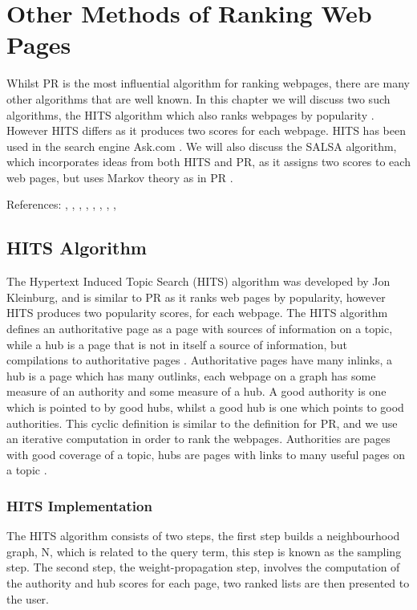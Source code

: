 \documentclass[11pt]{report}
\begin{document}
\chapter{Other Methods of Ranking Web Pages}

Whilst PR is the most influential algorithm for ranking webpages, there are many other algorithms that are well known. In this chapter we will discuss two such algorithms, the HITS algorithm which also ranks webpages by popularity \cite{kleinberg1999authoritative}. However HITS differs as it produces two scores for each webpage. HITS has been used in the search engine Ask.com \cite{bonato}. We will also discuss the SALSA algorithm, which incorporates ideas from both HITS and PR, as it assigns two scores to each web pages, but uses Markov theory as in PR \cite{lempel2000stochastic}. 


References: \cite{baldi2003modeling}, \cite{bharat1998improved}, \cite{bonato}, \cite{ding2003pagerank}, \cite{farahat2006authority}, \cite{langville}, \cite{manning}, \cite{ng2001link}, \cite{ng2001stable}

\section{HITS Algorithm}
The Hypertext Induced Topic Search (HITS) algorithm was developed by Jon Kleinburg, and is similar to PR as it ranks web pages by popularity, however HITS produces two popularity scores, for each webpage. The HITS algorithm defines an authoritative page as a page with sources of information on a topic, while a hub is a page that is not in itself a source of information, but compilations to authoritative pages \cite{manning}. Authoritative pages have many inlinks, a hub is a page which has many outlinks, each webpage on a graph has some measure of an authority and some measure of a hub. A good authority is one which is pointed to by good hubs, whilst a good hub is one which points to good authorities. This cyclic definition is similar to the definition for PR, and we use an iterative computation in order to rank the webpages. Authorities are pages with good coverage of a topic, hubs are pages with links to many useful pages on a topic \cite{bonato}. 

\subsection{HITS Implementation}
The HITS algorithm consists of two steps, the first step builds a neighbourhood graph, N, which is related to the query term, this step is known as the sampling step. The second step, the weight-propagation step, involves the computation of the authority and hub scores for each page, two ranked lists are then presented to the user.  
\end{document}
